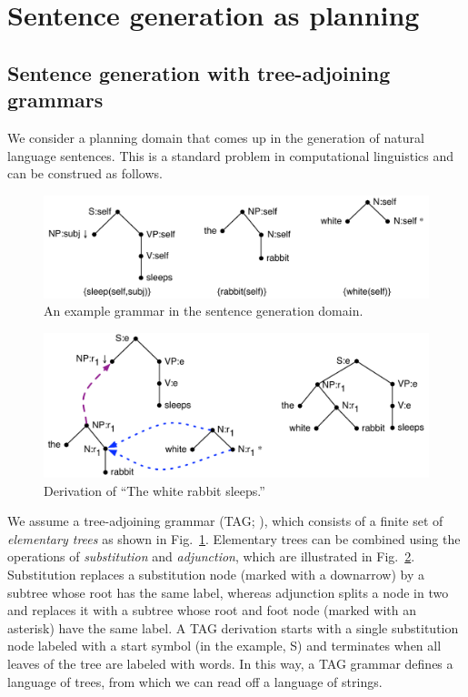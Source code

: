 \section{Sentence generation as planning}
\label{sec:crisp}


\subsection{Sentence generation with tree-adjoining grammars}

We consider a planning domain that comes up in the generation of
natural language sentences. This is a standard problem in
computational linguistics and can be construed as follows.


\begin{figure}
  \centering
  \includegraphics[width=0.75\columnwidth]{pic-grammar}
  \caption{An example grammar in the sentence generation domain.}
  \label{fig:white-rabbit-sleeps-grammar}
\end{figure}

\begin{figure}
  \centering
  \includegraphics[width=0.75\columnwidth]{pic-derivation}
  \caption{Derivation of ``The white rabbit sleeps.''}
  \label{fig:white-rabbit-sleeps-deriv}
\end{figure}

We assume a tree-adjoining grammar (TAG; \cite{joshi;etal1997}), which
consists of a finite set of \emph{elementary trees} as shown in
Fig.~\ref{fig:white-rabbit-sleeps-grammar}. Elementary trees can be
combined using the operations of \emph{substitution} and
\emph{adjunction}, which are illustrated in
Fig.~\ref{fig:white-rabbit-sleeps-deriv}. Substitution replaces a
substitution node (marked with a downarrow) by a subtree whose root
has the same label, whereas adjunction splits a node in two and
replaces it with a subtree whose root and foot node (marked with an
asterisk) have the same label. A TAG derivation starts with a single
substitution node labeled with a start symbol (in the example, S) and
terminates when all leaves of the tree are labeled with words. In this
way, a TAG grammar defines a language of trees, from which we can read
off a language of strings.

